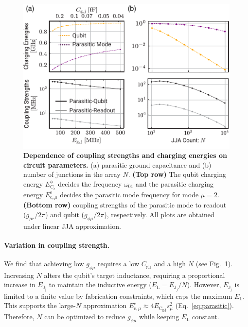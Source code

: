 \documentclass[%
reprint,
superscriptaddress,
 amsmath,amssymb,
 aps,
 prx,
longbibliography,
floatfix,
]{revtex4-2}
\begin{document}
\begin{figure}[t]
    \centering
    \includegraphics[width=\linewidth]{Supp_Fig/Circuit_comp.pdf}
    \caption{{\bf Dependence of coupling strengths and charging energies on circuit parameters.} (a) parasitic ground capacitance and (b) number of junctions in the array $N$. {\bf (Top row)} The qubit charging energy $E_{\textrm{C}_\textrm{c}}^\phi$ decides the frequency $\omega_{01}$ and the parasitic charging energy $E_{\textrm{c}, \mu}^\textrm{e}$ decides the parasitic mode frequency for mode $\mu=2$. {\bf (Bottom row)} coupling strengths of the parasitic mode to readout ($g_{\mu r}/2\pi$) and qubit ($g_{\phi \mu}/2\pi$), respectively. All plots are obtained under linear JJA approximation.}
    \label{fig:circuit_comp}
\end{figure}
\paragraph{Variation in coupling strength.}\label{coupling} 
We find that achieving low \( g_{\phi\mu} \) requires a low \( C_\textrm{g,j} \) and a high \( N \) (see Fig.~\ref{fig:circuit_comp}). Increasing \( N \) alters the qubit's target inductance, requiring a proportional increase in \( E_{\textrm{J}_\textrm{j}} \) to maintain the inductive energy (\( E_\textrm{L} = E_{\textrm{J}_\textrm{j}}/N \)). However, \( E_{\textrm{J}_\textrm{j}} \) is limited to a finite value by fabrication constraints, which caps the maximum \( E_\textrm{L} \). This supports the large-\( N \) approximation \( E_{\textrm{c},\mu}^e \approx 4E_{\textrm{C}_\textrm{g,j}}s_\mu^2 \) (Eq.~\ref{eq:parasitic}). Therefore, \( N \) can be optimized to reduce \( g_{\phi\mu} \) while keeping \( E_\textrm{L} \) constant.
\end{document}
